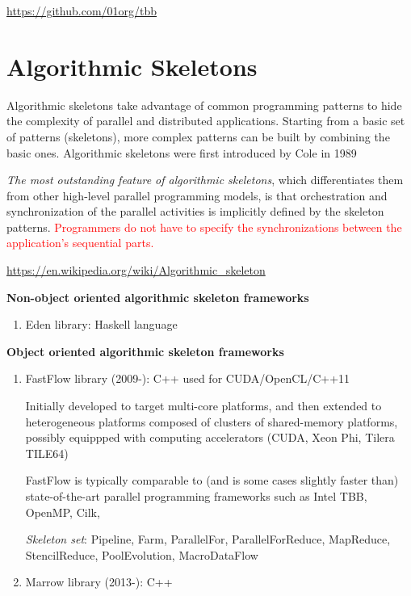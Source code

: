 \url{https://github.com/01org/tbb}



\section{Algorithmic Skeletons}
\label{sec:Algorithmic_Skeletons}

Algorithmic skeletons take advantage of common programming patterns to hide the
complexity of parallel and distributed applications. Starting from a basic set
of patterns (skeletons), more complex patterns can be built by combining the
basic ones. Algorithmic skeletons were first introduced by Cole in 1989


{\it The most outstanding feature of algorithmic skeletons}, which
differentiates them from other high-level parallel programming models, is that
orchestration and synchronization of the parallel activities is implicitly
defined by the skeleton patterns. \textcolor{red}{Programmers do not have to
specify the synchronizations between the application's sequential parts.}

\url{https://en.wikipedia.org/wiki/Algorithmic_skeleton}

{\bf Non-object oriented algorithmic skeleton frameworks}

\begin{enumerate}
  \item Eden library: Haskell language
\end{enumerate}


{\bf Object oriented algorithmic skeleton frameworks}
\begin{enumerate}
  \item FastFlow library (2009-): C++ used for CUDA/OpenCL/C++11
  
   Initially developed to target multi-core platforms, and then extended to
   heterogeneous platforms composed of clusters of shared-memory platforms,
   possibly equippped with computing accelerators (CUDA, Xeon Phi, Tilera
   TILE64)
  
  FastFlow is typically comparable to (and is some cases slightly faster than)
  state-of-the-art parallel programming frameworks such as Intel TBB, OpenMP, Cilk, 
  
  {\it Skeleton set}: 
  Pipeline, Farm, ParallelFor, ParallelForReduce, MapReduce, StencilReduce,
  PoolEvolution, MacroDataFlow
  
  \item Marrow library (2013-): C++   
\end{enumerate}
